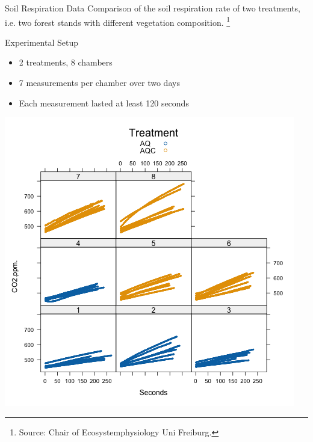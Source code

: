 \documentclass{beamer}
\begin{document}
\begin{frame}{Soil Respiration Data}
Comparison of the soil respiration rate of two treatments, i.e. two forest stands with different vegetation composition. \footnote{Source: Chair of Ecosystemphysiology Uni Freiburg.}

\end{frame}

\begin{frame}{Experimental Setup}
  \begin{itemize}
    \item 2 treatments, 8 chambers
    \item 7 measurements per chamber over two days
    \item Each measurement lasted at least 120 seconds
  \end{itemize}

\begin{center}
  \begin{minipage}{0.45\linewidth}
    \centering
    \includegraphics[width=\linewidth]{lectures/day_1_intro_to_mems/figures/plot_1.png}
  \end{minipage}
  \hspace{0.05\linewidth}  %
  \begin{minipage}{0.45\linewidth}
    \centering

\end{minipage}
\end{center}
\end{frame}
\end{document}
